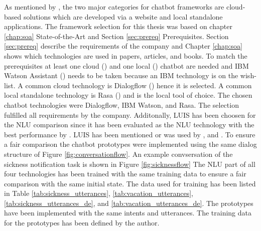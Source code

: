 As mentioned by \citet{kane2016role}, the two major categories for chatbot frameworks 
are cloud-based solutions which are developed via a website and local standalone applications.
The framework selection for this thesis was based on chapter \ref{chap:soa} State-of-the-Art 
and Section \ref{sec:prereq} Prerequisites.
Section \ref{sec:prereq} describe the requirements of the company and Chapter \ref{chap:soa} shows which technologies are 
used in papers, articles, and books.
To match the prerequisites at least one cloud (\citet{braunEvaluatingNLU, rahman2017programming}) and one local (\citet{braunEvaluatingNLU}) chatbot are needed and IBM Watson Assistant (\citet{rahman2017programming, pharmacybot, ieee2018watson, gregori2017evaluation}) needs to be taken because an IBM technology is on the wish-list.
A common cloud technology is Dialogflow (\citet{braunEvaluatingNLU, dutta2017developing, singhbuilding, buiildChatbotsPython, rahman2017programming, ieee2018watson}) hence it is selected.
A common local standalone technology is Rasa (\citet{braunEvaluatingNLU, singhbuilding, rasabocklisch2017, buiildChatbotsPython, gregori2017evaluation}) and is the local tool of choice.
The chosen chatbot technologies were Dialogflow, IBM Watson, and Rasa.
The selection fulfilled all requirements by the company.
Additonally, LUIS\cite{luis2015williams} has been choosen for the NLU comparison since it 
has been evaluated as the NLU technology with the best performance by \citet{braunEvaluatingNLU}.
LUIS has been mentioned or was used by \citet{singhbuilding, buiildChatbotsPython, rahman2017programming, dutta2017developing}, 
and \citet{gregori2017evaluation}.
To ensure a fair comparison the chatbot prototypes were implemented using the same 
dialog structure of Figure \ref{fig:conversationflow}.
An example convsersation of the sickness notification task is shown in Figure \ref{fig:sicknessflow}
The NLU part of all four technologies has been trained with the same training data to 
ensure a fair comparison with the same initial state.
The data used for training has been listed in
Table \ref{tab:sickness_utterances}, \ref{tab:vacation_utterances}, \ref{tab:sickness_utterances_de}, 
and \ref{tab:vacation_utterances_de}.
The prototypes have been implemented with the same intents and utterances.
The training data for the prototypes has been defined by the author.
